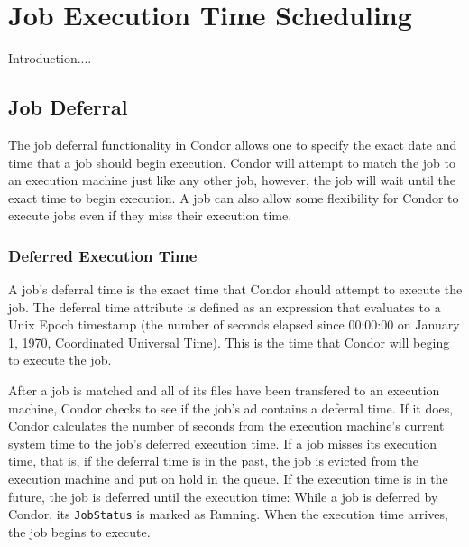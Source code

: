 \documentclass[a4paper, 11pt]{article}
\newcommand{\AdAttr}[1]{\texttt{#1}}	%
\begin{document}
\doublespacing

\section{Job Execution Time Scheduling}
\label{sec:job-executetime-scheduling}

Introduction....

\subsection{Job Deferral}
\label{sec:jobdeferral}

The job deferral functionality in Condor allows one to specify the exact date and time that a job should begin execution. Condor will attempt to match the job to an execution machine just like any other job, however, the job will wait until the exact time to begin execution. A job can also allow some flexibility for Condor to execute jobs even if they miss their execution time.

\subsubsection{Deferred Execution Time}
\label{sec:jobdeferral-deferraltime}
A job's deferral time is the exact time that Condor should attempt to execute the job. The deferral time attribute is defined as an expression that evaluates to a Unix Epoch timestamp (the number of seconds elapsed since 00:00:00 on January 1, 1970, Coordinated Universal Time). This is the time that Condor will beging to execute the job.

After a job is matched and all of its files have been transfered to an execution machine, Condor checks to see if the job's ad contains a deferral time. If it does, Condor calculates the number of seconds from the execution machine's current system time to the job's deferred execution time. If a job misses its execution time, that is, if the deferral time is in the past, the job is evicted from the execution machine and put on hold in the queue. If the execution time is in the future, the job is deferred until the execution time: While a job is deferred by Condor, its \AdAttr{JobStatus} is marked as Running. When the execution time arrives, the job begins to execute.
\end{document}
